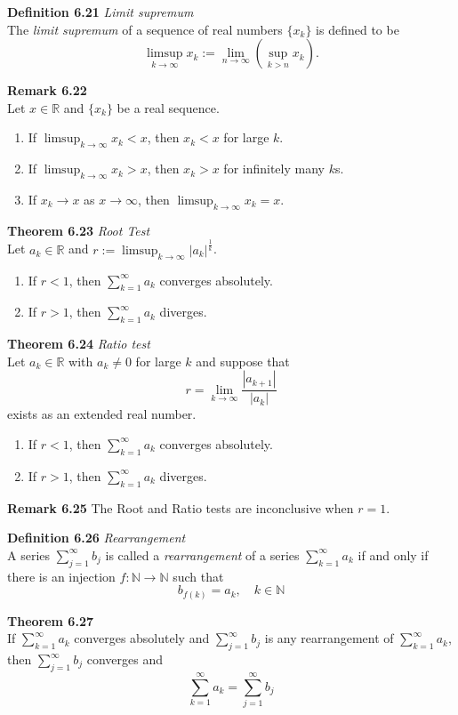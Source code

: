 \documentclass[8pt,landscape]{article}
\begin{document}
\begin{multicols}{3}
\textbf{Definition 6.21} \emph{Limit supremum} \\
The \emph{limit supremum} of a sequence of real numbers $\{x_k\}$ is defined to be
\[
    \limsup_{k \to \infty} x_k := \lim_{n \to \infty} \left( \sup_{k>n} x_k \right).
\]

\textbf{Remark 6.22} \\
Let $x \in \mathbb{R}$ and $\{x_k\}$ be a real sequence.
\begin{enumerate}
    \item If $\limsup_{k \to \infty} x_k < x$, then $x_k < x$ for large $k$.
    \item If $\limsup_{k \to \infty} x_k > x$, then $x_k > x$ for infinitely many $k$s.
    \item If $x_k \to x$ as $x \to \infty$, then $\limsup_{k \to \infty} x_k = x$.
\end{enumerate}

\textbf{Theorem 6.23} \emph{Root Test} \\
Let $a_k \in \mathbb{R}$ and $r := \limsup_{k \to \infty} |a_k|^{\frac{1}{k}}$.
\begin{enumerate}
    \item If $r < 1$, then $\sum_{k=1}^\infty a_k$ converges absolutely.
    \item If $r > 1$, then $\sum_{k=1}^\infty a_k$ diverges.
\end{enumerate}

\textbf{Theorem 6.24} \emph{Ratio test} \\
Let $a_k \in \mathbb{R}$ with $a_k \neq 0$ for large $k$ and suppose that
\[
    r = \lim_{k \to \infty} \frac{|a_{k+1}|}{|a_k|}
\]
exists as an extended real number.
\begin{enumerate}
    \item If $r < 1$, then $\sum_{k=1}^\infty a_k$ converges absolutely.
    \item If $r > 1$, then $\sum_{k=1}^\infty a_k$ diverges.
\end{enumerate}

\textbf{Remark 6.25}
The Root and Ratio tests are inconclusive when $r = 1$.

\textbf{Definition 6.26} \emph{Rearrangement} \\
A series $\sum_{j=1}^\infty b_j$ is called a \emph{rearrangement} of a series
$\sum_{k=1}^\infty a_k$ if and only if there is an injection
$f : \mathbb{N} \to \mathbb{N}$ such that
\[
    b_{f(k)} = a_k, \quad k \in \mathbb{N}
\]

\textbf{Theorem 6.27} \\
If $\sum_{k=1}^\infty a_k$ converges absolutely and $\sum_{j=1}^\infty b_j$
is any rearrangement of $\sum_{k=1}^\infty a_k$, then $\sum_{j=1}^\infty b_j$
converges and
\[
    \sum_{k=1}^\infty a_k = \sum_{j=1}^\infty b_j
\]


\end{multicols}
\end{document}

